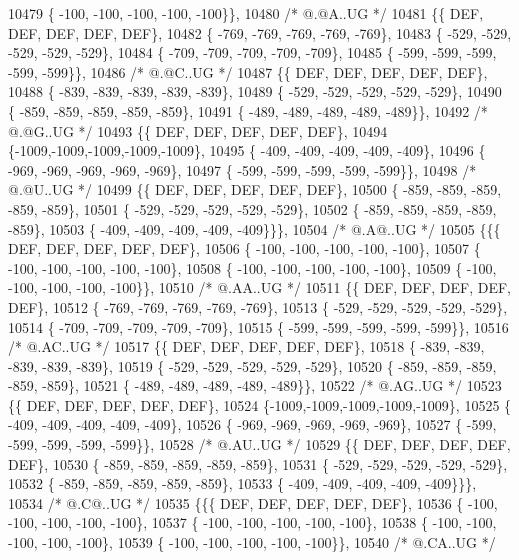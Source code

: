 \begin{DoxyCode}
10479 \{ -100, -100, -100, -100, -100\}\},
10480 \textcolor{comment}{/*  @.@A..UG */}
10481 \{\{  DEF,  DEF,  DEF,  DEF,  DEF\},
10482 \{ -769, -769, -769, -769, -769\},
10483 \{ -529, -529, -529, -529, -529\},
10484 \{ -709, -709, -709, -709, -709\},
10485 \{ -599, -599, -599, -599, -599\}\},
10486 \textcolor{comment}{/*  @.@C..UG */}
10487 \{\{  DEF,  DEF,  DEF,  DEF,  DEF\},
10488 \{ -839, -839, -839, -839, -839\},
10489 \{ -529, -529, -529, -529, -529\},
10490 \{ -859, -859, -859, -859, -859\},
10491 \{ -489, -489, -489, -489, -489\}\},
10492 \textcolor{comment}{/*  @.@G..UG */}
10493 \{\{  DEF,  DEF,  DEF,  DEF,  DEF\},
10494 \{-1009,-1009,-1009,-1009,-1009\},
10495 \{ -409, -409, -409, -409, -409\},
10496 \{ -969, -969, -969, -969, -969\},
10497 \{ -599, -599, -599, -599, -599\}\},
10498 \textcolor{comment}{/*  @.@U..UG */}
10499 \{\{  DEF,  DEF,  DEF,  DEF,  DEF\},
10500 \{ -859, -859, -859, -859, -859\},
10501 \{ -529, -529, -529, -529, -529\},
10502 \{ -859, -859, -859, -859, -859\},
10503 \{ -409, -409, -409, -409, -409\}\}\},
10504 \textcolor{comment}{/*  @.A@..UG */}
10505 \{\{\{  DEF,  DEF,  DEF,  DEF,  DEF\},
10506 \{ -100, -100, -100, -100, -100\},
10507 \{ -100, -100, -100, -100, -100\},
10508 \{ -100, -100, -100, -100, -100\},
10509 \{ -100, -100, -100, -100, -100\}\},
10510 \textcolor{comment}{/*  @.AA..UG */}
10511 \{\{  DEF,  DEF,  DEF,  DEF,  DEF\},
10512 \{ -769, -769, -769, -769, -769\},
10513 \{ -529, -529, -529, -529, -529\},
10514 \{ -709, -709, -709, -709, -709\},
10515 \{ -599, -599, -599, -599, -599\}\},
10516 \textcolor{comment}{/*  @.AC..UG */}
10517 \{\{  DEF,  DEF,  DEF,  DEF,  DEF\},
10518 \{ -839, -839, -839, -839, -839\},
10519 \{ -529, -529, -529, -529, -529\},
10520 \{ -859, -859, -859, -859, -859\},
10521 \{ -489, -489, -489, -489, -489\}\},
10522 \textcolor{comment}{/*  @.AG..UG */}
10523 \{\{  DEF,  DEF,  DEF,  DEF,  DEF\},
10524 \{-1009,-1009,-1009,-1009,-1009\},
10525 \{ -409, -409, -409, -409, -409\},
10526 \{ -969, -969, -969, -969, -969\},
10527 \{ -599, -599, -599, -599, -599\}\},
10528 \textcolor{comment}{/*  @.AU..UG */}
10529 \{\{  DEF,  DEF,  DEF,  DEF,  DEF\},
10530 \{ -859, -859, -859, -859, -859\},
10531 \{ -529, -529, -529, -529, -529\},
10532 \{ -859, -859, -859, -859, -859\},
10533 \{ -409, -409, -409, -409, -409\}\}\},
10534 \textcolor{comment}{/*  @.C@..UG */}
10535 \{\{\{  DEF,  DEF,  DEF,  DEF,  DEF\},
10536 \{ -100, -100, -100, -100, -100\},
10537 \{ -100, -100, -100, -100, -100\},
10538 \{ -100, -100, -100, -100, -100\},
10539 \{ -100, -100, -100, -100, -100\}\},
10540 \textcolor{comment}{/*  @.CA..UG */}

\end{DoxyCode}
